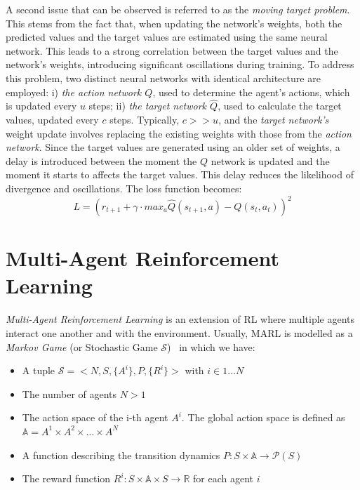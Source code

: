 \documentclass[12pt,a4paper,openright,twoside]{book}
\begin{document}
A second issue that can be observed is referred to as the \emph{moving target problem}. This stems from the fact that,
    when updating the network's weights, both the predicted values and the target values are estimated using the 
    same neural network. This leads to a strong correlation between the target values and the network's weights, 
    introducing significant oscillations during training. To address this problem, two distinct neural networks 
    with identical architecture are employed: 
    i) \emph{the action network $Q$}, used to determine the agent's actions, which is updated every $u$ steps; 
    ii) \emph{the target network $\hat{Q}$}, used to calculate the target values, updated every $c$ steps. 
    Typically, $c >> u$, and the \emph{target network's} weight update involves replacing the existing weights with 
    those from the \emph{action network}.
    Since the target values are generated using an older set of weights, a delay is introduced between the 
    moment the $Q$ network is updated and the moment it starts to affects the target values.
    This delay reduces the likelihood of divergence and oscillations. The loss function becomes:
    $$ L = ( r_{t+1} + \gamma \cdot max_a \hat{Q}(s_{t+1}, a) - Q(s_t, a_t))^2 $$

\section{Multi-Agent Reinforcement Learning}
\emph{Multi-Agent Reinforcement Learning} is an extension of RL where multiple agents interact one another and 
    with the environment. 
    Usually, MARL is modelled as a \emph{Markov Game} (or Stochastic Game $\mathcal{S}$)~\cite{LITTMAN1994157} in
    which we have:
    \begin{itemize}
        \item A tuple $\mathcal{S} = <N, S, \{A^i\}, P, \{R^i\}>$ with $i \in 1 \dots N$
        \item The number of agents $N > 1$
        \item The action space of the i-th agent $A^i$. The global action space is defined as $\mathbb{A} = A^1 \times A^2 \times \dots \times A^N$
        \item A function describing the transition dynamics $P: S \times \mathbb{A} \rightarrow \mathcal{P}(S)$
        \item The reward function $R^i: S \times \mathbb{A} \times S \rightarrow \mathbb{R}$ for each agent $i$ 
    \end{itemize}
\end{document}
